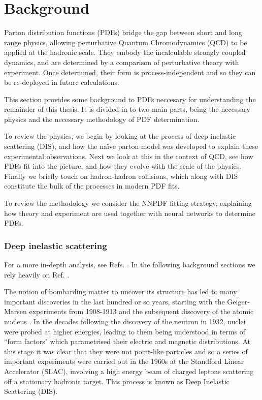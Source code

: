 \chapter{Background}
\label{chapter:background}
Parton distribution functions (PDFs) bridge the gap between short and long range physics, allowing perturbative Quantum Chromodynamics (QCD) to be applied at the hadronic scale. They embody the incalculable strongly coupled dynamics, and are determined by a comparison of perturbative theory with experiment. Once determined, their form is process-independent and so they can be re-deployed in future calculations. 

This section provides some background to PDFs neccesary for understanding the remainder of this thesis. It is divided in to two main parts, being the necessary physics and the necessary methodology of PDF determination.

To review the physics, we begin by looking at the process of deep inelastic scattering (DIS), and how the na\"ive parton model was developed to explain these experimental observations. Next we look at this in the context of QCD, see how PDFs fit into the picture, and how they evolve with the scale of the physics. Finally we briefly touch on hadron-hadron collisions, which along with DIS constitute the bulk of the processes in modern PDF fits.

To review the methodology we consider the NNPDF fitting strategy, explaining how theory and experiment are used together with neural networks to determine PDFs.

\subsection{Deep inelastic scattering}
For a more in-depth analysis, see Refs. \cite{pinkbook, hm}. In the following background sections we rely heavily on Ref. \cite{nikhefnotes}.

The notion of bombarding matter to uncover its structure has led to many important discoveries in the last hundred or so years, starting with the Geiger-Marsen experiments from 1908-1913 and the subsequent discovery of the atomic nucleus \cite{nucleus}. In the decades following the discovery of the neutron in 1932, nuclei were probed at higher energies, leading to them being understood in terms of ``form factors" which parametrised their electric and magnetic distributions. At this stage it was clear that they were not point-like particles and so a series of important experiments were carried out in the 1960s at the Standford Linear Accelerator (SLAC), involving a high energy beam of charged leptons scattering off a stationary hadronic target. This process is known as Deep Inelastic Scattering (DIS). 

